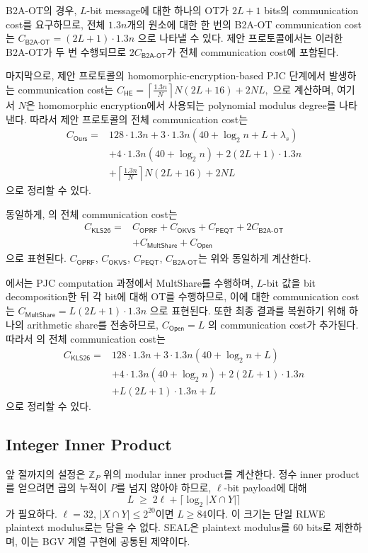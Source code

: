 \documentclass[sigconf,anonymous,review]{acmart}
\newcommand{\Z}{\mathbb{Z}}
\begin{document}
B2A-OT의 경우, $L$-bit message에 대한 하나의 OT가
$2L+1$ bits의 communication cost를 요구하므로,
전체 $1.3n$개의 원소에 대한 한 번의 B2A-OT communication
cost는
$
C_{\mathsf{B2A\mbox{-}OT}}
=
(2L+1)\cdot 1.3n
$
으로 나타낼 수 있다.
제안 프로토콜에서는 이러한 B2A-OT가 두 번 수행되므로
$2C_{\mathsf{B2A\mbox{-}OT}}$가 전체 communication cost에
포함된다.

마지막으로, 제안 프로토콜의 homomorphic-encryption-based
PJC 단계에서 발생하는 communication cost는
$
C_{\mathsf{HE}}
=
\left\lceil
\frac{1.3n}{N}
\right\rceil
N(2L+16)
+
2NL,
$
으로 계산하며, 여기서 $N$은 homomorphic encryption에서
사용되는 polynomial modulus degree를 나타낸다.
따라서 제안 프로토콜의 전체 communication cost는
\[
\begin{aligned}
C_{\mathsf{Ours}}
={}&
128\cdot1.3n
+
3\cdot1.3n(40+\log_2 n+L+\lambda_s) \\
&+
4\cdot1.3n(40+\log_2 n)
+
2(2L+1)\cdot1.3n \\
&+
\left\lceil
\frac{1.3n}{N}
\right\rceil
N(2L+16)
+
2NL
\end{aligned}
\]
으로 정리할 수 있다.

동일하게, \cite{KLS26}의 전체 communication cost는
\[
\begin{aligned}
C_{\mathsf{KLS26}}
={}&
C_{\mathsf{OPRF}}
+C_{\mathsf{OKVS}}
+C_{\mathsf{PEQT}}
+2C_{\mathsf{B2A\mbox{-}OT}} \\
&+
C_{\mathsf{MultShare}}
+C_{\mathsf{Open}}
\end{aligned}
\]
으로 표현된다.
$C_{\mathsf{OPRF}}$, $C_{\mathsf{OKVS}}$,
$C_{\mathsf{PEQT}}$, $C_{\mathsf{B2A\mbox{-}OT}}$는
위와 동일하게 계산한다.

\cite{KLS26}에서는 PJC computation 과정에서 MultShare를
수행하며, $L$-bit 값을 bit decomposition한 뒤 각 bit에 대해
OT를 수행하므로, 이에 대한 communication cost는
$
C_{\mathsf{MultShare}}
=
L(2L+1)\cdot1.3n
$
으로 표현된다.
또한 최종 결과를 복원하기 위해 하나의 arithmetic share를
전송하므로,
$
C_{\mathsf{Open}}
=
L
$
의 communication cost가 추가된다.
따라서 \cite{KLS26}의 전체 communication cost는
\[
\begin{aligned}
C_{\mathsf{KLS26}}
={}&
128\cdot1.3n
+
3\cdot1.3n(40+\log_2 n+L) \\
&+
4\cdot1.3n(40+\log_2 n)
+
2(2L+1)\cdot1.3n \\
&+
L(2L+1)\cdot1.3n
+
L
\end{aligned}
\]
으로 정리할 수 있다.

\subsection{Integer Inner Product}\label{sec:integer-ip}
앞 절까지의 설정은 $\Z_P$ 위의 modular inner product를 계산한다. 정수
inner product를 얻으려면 곱의 누적이 $P$를 넘지 않아야 하므로,
$\ell$-bit payload에 대해
\[
L \;\ge\; 2\ell+\lceil\log_2|X\cap Y|\rceil
\]
가 필요하다. $\ell=32$, $|X\cap Y|\le 2^{20}$이면 $L\ge 84$이다. 이 크기는
단일 RLWE plaintext modulus로는 담을 수 없다. SEAL은 plaintext modulus를
60 bits로 제한하며, 이는 BGV 계열 구현에 공통된 제약이다.
\end{document}
